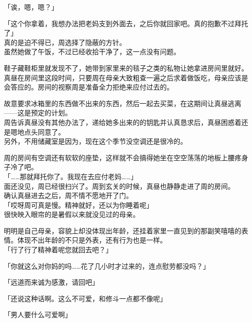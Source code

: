 「诶，嗯，嗯？」

「这个你拿着，我想办法把老妈支到外面去，之后你就回家吧。真的抱歉不过拜托了」\\

真的是迫不得已，周选择了隐蔽的方针。\\

虽然她做了午饭，不过已经收拾干净了，这一点没有问题。

鞋子藏鞋柜里就发现不了，她带到家里来的毯子之类的私物让她拿进房间里就好。\\

真昼在房间里这段时间，只要周在母亲大致粗查一遍之后求着做饭吃，母亲应该是会答应的。房间的视察周是准备全力拒绝来应付过去的。

故意要求冰箱里的东西做不出来的东西，然后一起去买菜，在这期间让真昼逃离——这是预定的计划。\\

周告诉真昼没有其他办法了，递给她多出来的的钥匙并认真恳求后，真昼困惑着还是嗯地点头同意了。\\

另外，不用储藏室是因为，现在这个季节没空调还是很冷的。

周的房间有空调还有软软的座垫，这样就不会搞得她坐在空空荡荡的地板上腰疼身子冷了吧。\\

「……那就拜托你了。我现在去应付老妈……」\\

面还没见，周已经很扫兴了。周到玄关的时候，真昼也静静走进了周的房间。\\

确认真昼进去之后，周不情不愿地开了门。\\

「哎呀周可真是慢。精神就好，还以为你睡着呢」\\

很快映入眼帘的是暑假以来就没见过的母亲。

明明是自己母亲，容貌上却没体现出年龄，还挂着家里一直见到的那副笑嘻嘻的表情。体现不出年龄的不只是外表，还有行为也是一样。\\

「行了行了精神着呢您就回去吧？」

「你就这么对你妈的吗……花了几小时才过来的，连点慰劳都没吗？」

「远道而来诚为感激，请回吧」

「还说这种话啊。这么不可爱，和修斗一点都不像呢」

「男人要什么可爱啊」\\


